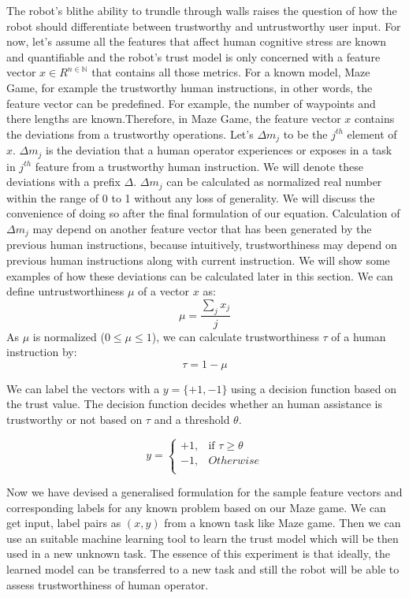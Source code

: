 \documentclass{sig-alternate}
\begin{document}
The robot's blithe ability to trundle through walls raises the
question of how the robot should differentiate between trustworthy and untrustworthy user input. For now, let's assume all the features that affect human cognitive stress are known and quantifiable and the robot's trust model is only concerned with a feature vector $ x \in R^{n \in \mathbb{N}} $ that contains all those metrics. For a known model, Maze Game, for example the trustworthy human instructions, in other words, the feature vector can be predefined. For example, the number of waypoints and there lengths are known.Therefore, in Maze Game, the feature vector $x$ contains the deviations from a trustworthy operations. Let's $\Delta m_j$ to be the $ j^{th} $ element of $x$. $\Delta m_j$ is the deviation that a human operator experiences or exposes in a task in $ j^{th} $ feature from a trustworthy human instruction. We will denote these deviations with a prefix $\Delta$. $\Delta m_j$ can be calculated as normalized real number within the range of 0 to 1 without any loss of generality. We will discuss the convenience of doing so after the final formulation of our equation. Calculation of $\Delta m_j$ may depend on another feature vector that has been generated by the previous human instructions, because intuitively, trustworthiness may depend on previous human instructions along with current instruction. We will show some examples of how these deviations can be calculated later in this section. We can define untrustworthiness $\mu $ of a vector $x$ as:
\begin{equation}
  \label{eq:general_untrust}
  \mu=\dfrac{\sum_{j} x_j}{j}
\end{equation}
As $\mu$ is normalized ($0\leq \mu \leq 1$), we can calculate trustworthiness $\tau$ of a human instruction by:
\begin{equation}
  \label{eq:general_trust}
  \tau=1 - \mu
\end{equation}

We can label the vectors with a $y = \{+1, -1\}$ using a decision function based on the trust value. The decision function decides whether an human assistance is trustworthy or not based on $\tau$ and a threshold $\theta$.

\[
y = 
\begin{cases}
+1, & \text{if } \tau\ge \theta\\
-1, & Otherwise\\
\end{cases}
\]

Now we have devised a generalised formulation for the sample feature vectors and corresponding labels for any known problem based on our Maze game. We can get input, label pairs as $(x, y)$ from a known task like Maze game. Then we can use an suitable machine learning tool to learn the trust model which will be then used in a new unknown  task. The essence of this experiment is that ideally, the learned model can be transferred to a new task and still the robot will be able to assess trustworthiness of human operator.
  
\end{document}
